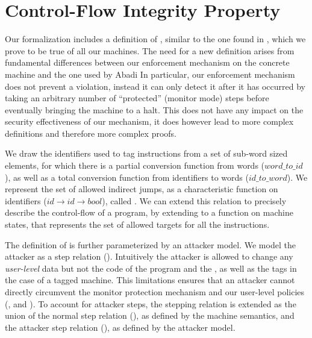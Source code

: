 


\section{Control-Flow Integrity Property}\label{sec:cfi_property}

Our formalization includes a definition of \CFI, similar to the one found in
\cite{AbadiBEL09}, which we prove to be true of all our machines. The need for a
new definition arises from fundamental differences between our enforcement
mechanism on the concrete machine and the one used by Abadi \ETAL In
particular, our enforcement mechanism does not prevent a violation, instead
it can only detect it after it has occurred by taking an arbitrary number of
``protected'' (monitor mode) steps before eventually bringing the machine to a
halt. This does not have any impact on the security effectiveness of our
mechanism, it does however lead to more complex definitions and therefore
more complex proofs.

We draw the identifiers used to tag instructions from a set of
sub-word sized elements, for which there is a partial conversion
function from words ($word\_to\_id$), as well as a total conversion
function from identifiers to words ($id\_to\_word$).
We represent the set of allowed indirect jumps, as a characteristic
function on identifiers ($id \rightarrow id \rightarrow bool$), called
\CFG. We can extend this relation to precisely describe the
control-flow of a program, by extending \CFG to a function \SUCC{} on
machine states, that represents the set of allowed targets for all the
instructions. 

The definition of \CFI is further parameterized by an attacker
model. We model the attacker as a step relation
(\stepa{}{}{}). Intuitively the attacker is allowed to change any
\emph{user-level} data but not the code of the program and the \pc, as
well as the tags in the case of a tagged machine.  This limitations
ensures that an attacker cannot directly circumvent the monitor
protection mechanism and our user-level policies (\NWC , \NXD and
\CFI). To account for attacker steps, the stepping relation is
extended as the union of the normal step relation (\stepn{}{}), as
defined by the machine semantics, and the attacker step relation
(\stepa{}{}{}), as defined by the attacker model.

